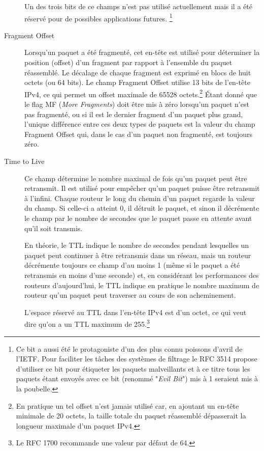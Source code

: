 \begin{description}
Un des trois bits de ce champs n'est pas utilisé actuellement mais il a été
réservé pour de possibles applications futures.
\footnote {Ce bit a aussi été le protagoniste d'un des plus connu poissons
d'avril de l'IETF. Pour faciliter les tâches des systèmes de filtrage 
le RFC 3514 propose d'utiliser ce bit pour étiqueter les paquets malveillants et à ce
titre tous les paquets étant envoyés avec ce bit (renommé "{\it Evil Bit}") 
mis à 1 seraient mis à la poubelle.}

\item [Fragment Offset]
Lorsqu'un paquet a été fragmenté, cet en-tête est utilisé pour déterminer la
position (offset) d'un fragment par rapport à l'ensemble du paquet réassemblé.
Le décalage de chaque fragment est exprimé en blocs de huit octets (ou 64
bits). Le champ Fragment Offset utilise 13 bits de l'en-tête IPv4, ce qui permet
un offset maximale de 65528 octets.\footnote {En pratique un tel offset n'est
jamais utilisé car, en ajoutant un en-tête minimale de 20 octets, la taille
totale du paquet réassemblé dépasserait la longueur maximale d'un paquet IPv4.}
Étant donné que le flag MF ({\it More Fragments}) doit être mis à zéro lorsqu'un paquet 
n'est pas fragmenté, ou si il est le dernier fragment d'un paquet plus grand, 
l'unique différence entre ces deux types de paquets est la valeur du 
champ Fragment Offset qui, dans le cas d'un paquet non fragmenté, est
toujours zéro.

\item [Time to Live]
Ce champ détermine le nombre maximal de fois qu'un paquet peut être retransmit. 
Il est utilisé pour empêcher qu'un paquet puisse être retransmit à l'infini.
Chaque routeur le long du chemin d'un paquet regarde la valeur du champ. Si celle-ci
a atteint 0, il détruit le paquet, et sinon il décrémente le champ par le
nombre de secondes que le paquet passe en attente avant qu'il soit transmis.

En théorie, le TTL indique le nombre de secondes pendant lesquelles un paquet
peut continuer à être retransmis dans un réseau, mais un routeur 
 décrémente toujours ce champ d'au moins 1 (même si le paquet a été
retransmis en moins d'une seconde) et, en considérant les performances des routeurs
d'aujourd'hui, le TTL indique en pratique le nombre maximum de routeur qu'un paquet
 peut traverser au cours de son acheminement.

L'espace réservé au TTL dans l'en-tête IPv4 est d'un octet, ce qui veut dire qu'on a un 
TTL maximum de 255.\footnote {Le RFC 1700 recommande une valeur par défaut de 64.}


\end{description}
